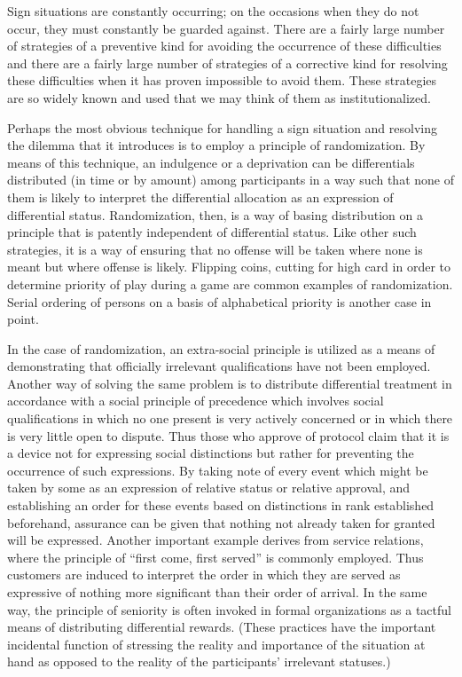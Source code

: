 \documentclass[twoside,symmetric,nobib,justified]{tufte-book}
\begin{document}
Sign situations are constantly occurring; on the occasions when they do
not occur, they must constantly be guarded against. There are a fairly
large number of strategies of a preventive kind for avoiding the
occurrence of these difficulties and there are a fairly large number of
strategies of a corrective kind for resolving these difficulties when it
has proven impossible to avoid them. These strategies are so widely
known and used that we may think of them as institutionalized.

Perhaps the most obvious technique for handling a sign situation and
resolving the dilemma that it introduces is to employ a principle of
randomization. By means of this technique, an indulgence or a
deprivation can be differentials distributed (in time or by amount)
among participants in a way such that none of them is likely to
interpret the differential allocation as an expression of differential
status. Randomization, then, is a way of basing distribution on a
principle that is patently independent of differential status. Like
other such strategies, it is a way of ensuring that no offense will be
taken where none is meant but where offense is likely. Flipping coins,
cutting for high card in order to determine priority of play during a
game are common examples of randomization. Serial ordering of persons on
a basis of alphabetical priority is another case in point.

In the case of randomization, an extra-social principle is utilized as a
means of demonstrating that officially irrelevant qualifications have
not been employed. Another way of solving the same problem is to
distribute differential treatment in accordance with a social principle
of precedence which involves social qualifications in which no one
present is very actively concerned or in which there is very little open
to dispute. Thus those who approve of protocol claim that it is a device
not for expressing social distinctions but rather for preventing the
occurrence of such expressions. By taking note of every event which
might be taken by some as an expression of relative status or relative
approval, and establishing an order for these events based on
distinctions in rank established beforehand, assurance can be given that
nothing not already taken for granted will be expressed. Another
important example derives from service relations, where the principle of
``first come, first served'' is commonly employed. Thus customers are
induced to interpret the order in which they are served as expressive of
nothing more significant than their order of arrival. In the same way,
the principle of seniority is often invoked in formal organizations as a
tactful means of distributing differential rewards. (These practices
have the important incidental function of stressing the reality and
importance of the situation at hand as opposed to the reality of the
participants' irrelevant statuses.)
\end{document}
